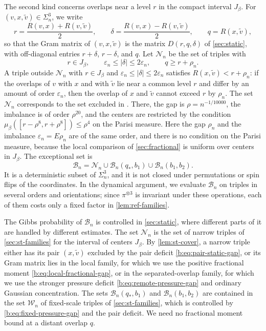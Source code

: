 The second kind concerns overlaps near a level $r$ in the compact interval
$J_\beta$. For $(v,x,{\widetilde v})\in\Sigma_n^3$, we write
\begin{equation}\label{b:dyn:narrow-coordinates}
 r=\frac{R(v,x)+R(v,{\widetilde v})}2,\qquad
 \delta=\frac{R(v,x)-R(v,{\widetilde v})}2,\qquad
 q=R(x,{\widetilde v}),
\end{equation}
so that the Gram matrix of $(v,x,{\widetilde v})$ is the matrix $D(r,q,\delta)$ of
\cref{sec:static}, with off-diagonal entries $r+\delta$, $r-\delta$, and $q$.
Let $\mathcal N_n$ be the set of triples with
\[
 r\in J_\beta,\qquad \varepsilon_n\le|\delta|\le2\varepsilon_n,\qquad
 q\ge r+\rho_n .
\]
A triple outside $\mathcal N_n$ with $r\in J_\beta$ and
$\varepsilon_n\le|\delta|\le2\varepsilon_n$ satisfies $R(x,{\widetilde v})<r+\rho_n$: if
the overlaps of $v$ with $x$ and with ${\widetilde v}$ lie near a common level $r$ and
differ by an amount of order $\varepsilon_n$, then the overlap of $x$ and ${\widetilde v}$
cannot exceed $r$ by $\rho_n$. The set $\mathcal N_n$ corresponds to the set
excluded in \cite[Lemma~7.1]{oai-barriers}. There, the gap is
$\rho=n^{-1/10000}$, the imbalance is of order $\rho^{20}$, and the centers
are restricted by the condition $\mu_\beta([r-\rho^8,r+\rho^8])\le\rho^4$ on
the Parisi measure. Here the gap $\rho_n$ and the imbalance
$\varepsilon_n=E\rho_n$ are of the same order, and there is no condition on
the Parisi measure, because the local comparison of \cref{sec:fractional} is
uniform over centers in $J_\beta$. The exceptional set is
\begin{equation}\label{eq:ref-exceptional}
 \mathcal B_n=\mathcal N_n\cup\mathcal B_n(q_*,b_1)\cup\mathcal B_n(b_1,b_2).
\end{equation}
It is a deterministic subset of $\Sigma_n^3$, and it is not closed under
permutations or spin flips of the coordinates. In the dynamical argument, we
evaluate $\mathcal B_n$ on triples in several orders and orientations; since
$\pi^{\otimes3}$ is invariant under these operations, each of them costs only
a fixed factor in \cref{lem:ref-families}.

The Gibbs probability of $\mathcal B_n$ is controlled in \cref{sec:static},
where different parts of it are handled by different estimates. The set
$\mathcal N_n$ is the set of narrow triples of \cref{sec:st-families} for the
interval of centers $J_\beta$. By \cref{lem:st-cover}, a narrow triple either
has its pair $(x,{\widetilde v})$ excluded by the pair deficit
\eqref{b:eq:pair-static-gap}, or its Gram matrix lies in the local family,
for which we use the positive fractional moment
\eqref{b:eq:local-fractional-gap}, or in the separated-overlap family, for
which we use the stronger pressure deficit \eqref{b:eq:remote-pressure-gap}
and ordinary Gaussian concentration. The sets $\mathcal B_n(q_*,b_1)$ and
$\mathcal B_n(b_1,b_2)$ are contained in the set $\mathcal W_n$ of
fixed-scale triples of \cref{sec:st-families}, which is controlled by
\eqref{b:eq:fixed-pressure-gap} and the pair deficit. We need
no fractional moment bound at a distant overlap $q$.

